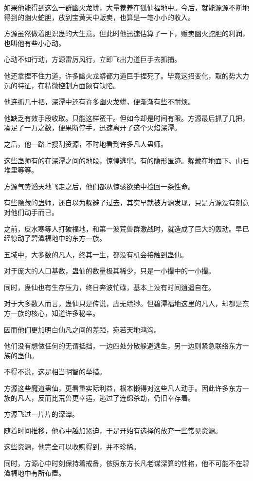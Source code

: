 \begin{this_body}
如果他能得到这么一群幽火龙蟒，大量豢养在狐仙福地中。今后，就能源源不断地得到的幽火蛇胆，放到宝黄天中贩卖，也算是一笔小小的收入。

方源虽然做着胆识蛊的大生意。但此时他迅速估算了一下，贩卖幽火蛇胆的利润，也叫他有些小心动。

心动不如行动，方源雷厉风行，立即飞出力道巨手去抓捕。

他还拿捏不住力道，许多幽火龙蟒都力道巨手捏死了。毕竟这招变化，取的势大力沉的特征，在精微控制方面颇有缺陷。

他连抓几十把，深潭中还有许多幽火龙蟒，便渐渐有些不耐烦。

他缺乏有效手段收取。只能这样蛮干。但如今却是时间有限。方源最后抓了几把，凑足了一万之数，便果断停手，迅速离开了这个火焰深潭。

之后，他一路上搜刮资源，不时地看到许多凡人蛊师。

这些蛊师有的在深潭之间的地段，惊惶逃窜。有的隐形匿迹。躲藏在地面下、山石堆里等等。

方源气势滔天地飞走之后，他们都从惊骇欲绝中捡回一条性命。

有些隐藏的蛊师，还自以为躲避了过去，其实早就被方源发现，只是方源没有刻意对他们动手而已。

之前，皮水寒等人打破福地，和第一波荒兽群激战时，就造成了巨大的轰动。早已经惊动了碧潭福地中的东方一族。

五域中，大多数的凡人，终其一生，都没有机会接触到蛊仙。

对于庞大的人口基数，蛊仙的数量极其稀少，只是一小撮中的一小撮。

同时，蛊仙也有生存压力，终日奔波忙碌，基本上没有时间逍遥自在。

对于大多数人而言，蛊仙只是传说，虚无缥缈。但碧潭福地这里的凡人，却都是东方一族的核心，知道许多秘辛。

因而他们更加明白仙凡之间的差距，宛若天地鸿沟。

他们没有想做任何的无谓抵挡，一边四处分散躲避逃生，另一边则紧急联络东方一族的蛊仙。

不得不说，这是相当明智的举措。

方源这些魔道蛊仙，更看重实际利益，根本懒得对这些凡人动手。因此许多东方一族的凡人，反而比荒兽更幸运，逃过了连绵杀劫，仍旧幸存着。

方源飞过一片片的深潭。

随着时间推移，他心中越加紧迫，于是开始有选择的放弃一些常见资源。

这些资源，他完全可以收购得到，并不珍稀。

同时，方源心中时刻保持着戒备，依照东方长凡老谋深算的性格，他不可能不在碧潭福地中有所布置。


\end{this_body}
